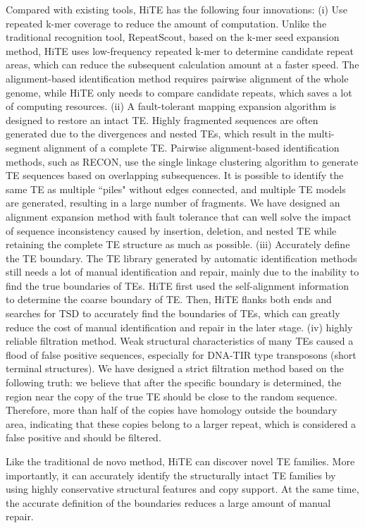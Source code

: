 \documentclass{bmcart}
\begin{document}
Compared with existing tools, HiTE has the following four innovations: (i) Use repeated k-mer coverage to reduce the amount of computation. Unlike the traditional recognition tool, RepeatScout, based on the k-mer seed expansion method, HiTE uses low-frequency repeated k-mer to determine candidate repeat areas, which can reduce the subsequent calculation amount at a faster speed. The alignment-based identification method requires pairwise alignment of the whole genome, while HiTE only needs to compare candidate repeats, which saves a lot of computing resources. (ii) A fault-tolerant mapping expansion algorithm is designed to restore an intact TE. Highly fragmented sequences are often generated due to the divergences and nested TEs, which result in the multi-segment alignment of a complete TE. Pairwise alignment-based identification methods, such as RECON, use the single linkage clustering algorithm to generate TE sequences based on overlapping subsequences. It is possible to identify the same TE as multiple ``piles" without edges connected, and multiple TE models are generated, resulting in a large number of fragments. We have designed an alignment expansion method with fault tolerance that can well solve the impact of sequence inconsistency caused by insertion, deletion, and nested TE while retaining the complete TE structure as much as possible. (iii) Accurately define the TE boundary. The TE library generated by automatic identification methods still needs a lot of manual identification and repair\cite{storer2022methodologies}, mainly due to the inability to find the true boundaries of TEs. HiTE first used the self-alignment information to determine the coarse boundary of TE. Then, HiTE flanks both ends and searches for TSD to accurately find the boundaries of TEs, which can greatly reduce the cost of manual identification and repair in the later stage. (iv) highly reliable filtration method. Weak structural characteristics of many TEs caused a flood of false positive sequences, especially for DNA-TIR type transposons (short terminal structures). We have designed a strict filtration method based on the following truth: we believe that after the specific boundary is determined, the region near the copy of the true TE should be close to the random sequence. Therefore, more than half of the copies have homology outside the boundary area, indicating that these copies belong to a larger repeat, which is considered a false positive and should be filtered.

Like the traditional de novo method, HiTE can discover novel TE families. More importantly, it can accurately identify the structurally intact TE families by using highly conservative structural features and copy support. At the same time, the accurate definition of the boundaries reduces a large amount of manual repair.
\end{document}

